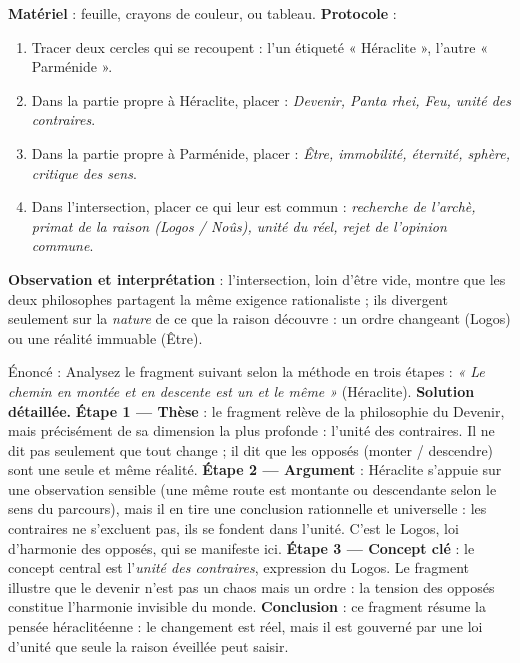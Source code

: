 \documentclass[11pt]{article}
\begin{document}
\begin{experience}
\textbf{Matériel} : feuille, crayons de couleur, ou tableau. \textbf{Protocole} :
\begin{enumerate}
\item Tracer deux cercles qui se recoupent : l'un étiqueté « Héraclite », l'autre « Parménide ».
\item Dans la partie propre à Héraclite, placer : \emph{Devenir, Panta rhei, Feu, unité des contraires}.
\item Dans la partie propre à Parménide, placer : \emph{Être, immobilité, éternité, sphère, critique des sens}.
\item Dans l'intersection, placer ce qui leur est commun : \emph{recherche de l'archè, primat de la raison (Logos / Noûs), unité du réel, rejet de l'opinion commune}.
\end{enumerate}
\textbf{Observation et interprétation} : l'intersection, loin d'être vide, montre que les deux philosophes partagent la même exigence rationaliste ; ils divergent seulement sur la \emph{nature} de ce que la raison découvre : un ordre changeant (Logos) ou une réalité immuable (Être).
\end{experience}

\begin{exoresolu}
Énoncé : Analysez le fragment suivant selon la méthode en trois étapes : \emph{« Le chemin en montée et en descente est un et le même »} (Héraclite).
\tcblower
\textbf{Solution détaillée.}
\textbf{Étape 1 — Thèse} : le fragment relève de la philosophie du Devenir, mais précisément de sa dimension la plus profonde : l'unité des contraires. Il ne dit pas seulement que tout change ; il dit que les opposés (monter / descendre) sont une seule et même réalité.
\textbf{Étape 2 — Argument} : Héraclite s'appuie sur une observation sensible (une même route est montante ou descendante selon le sens du parcours), mais il en tire une conclusion rationnelle et universelle : les contraires ne s'excluent pas, ils se fondent dans l'unité. C'est le Logos, loi d'harmonie des opposés, qui se manifeste ici.
\textbf{Étape 3 — Concept clé} : le concept central est l'\emph{unité des contraires}, expression du Logos. Le fragment illustre que le devenir n'est pas un chaos mais un ordre : la tension des opposés constitue l'harmonie invisible du monde.
\textbf{Conclusion} : ce fragment résume la pensée héraclitéenne : le changement est réel, mais il est gouverné par une loi d'unité que seule la raison éveillée peut saisir.
\end{exoresolu}
\end{document}
